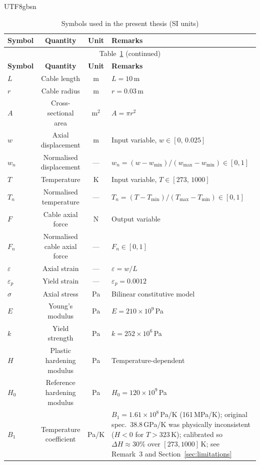 \documentclass[a4paper,12pt]{report}
\begin{document}
\begin{CJK}{UTF8}{gbsn}
\begin{longtable}{lcc p{7.5cm}}
  \caption{Symbols used in the present thesis (SI units)} \label{tab:symbols} \\
  \toprule
  \textbf{Symbol} & \textbf{Quantity} & \textbf{Unit} & \textbf{Remarks} \\
  \midrule
  \endfirsthead
  \multicolumn{4}{c}{\small Table~\ref{tab:symbols} (continued)} \\
  \toprule \textbf{Symbol} & \textbf{Quantity} & \textbf{Unit} & \textbf{Remarks} \\ \midrule
  \endhead
  \bottomrule \endfoot
  $L$ & Cable length & m & $L = 10$\,m \\
  $r$ & Cable radius & m & $r = 0.03$\,m \\
  $A$ & Cross-sectional area & m$^2$ & $A = \pi r^2$ \\
  $w$ & Axial displacement & m & Input variable, $w \in [0,\,0.025]$ \\
  $w_n$ & Normalised displacement & --- & $w_n = (w-w_{\min})/(w_{\max}-w_{\min}) \in [0,1]$ \\
  $T$ & Temperature & K & Input variable, $T \in [273,\,1000]$ \\
  $T_n$ & Normalised temperature & --- & $T_n = (T-T_{\min})/(T_{\max}-T_{\min}) \in [0,1]$ \\
  $F$ & Cable axial force & N & Output variable \\
  $F_n$ & Normalised cable axial force & --- & $F_n \in [0,1]$ \\
  $\varepsilon$ & Axial strain & --- & $\varepsilon = w/L$ \\
  $\varepsilon_p$ & Yield strain & --- & $\varepsilon_p = 0.0012$ \\
  $\sigma$ & Axial stress & Pa & Bilinear constitutive model \\
  $E$ & Young's modulus & Pa & $E = 210 \times 10^9$\,Pa \\
  $k$ & Yield strength & Pa & $k = 252 \times 10^6$\,Pa \\
  $H$ & Plastic hardening modulus & Pa & Temperature-dependent \\
  $H_0$ & Reference hardening modulus & Pa & $H_0 = 120 \times 10^9$\,Pa \\
  $B_1$ & Temperature coefficient & Pa/K & $B_1 = 1.61 \times 10^{8}$\,Pa/K (161\,MPa/K); original spec.\ 38.8\,GPa/K was physically inconsistent ($H<0$ for $T>323$\,K); calibrated so $\Delta H\approx30\%$ over $[273,1000]$\,K; see Remark~3 and Section~\ref{sec:limitations} \\

\end{longtable}
\end{CJK}
\end{document}
